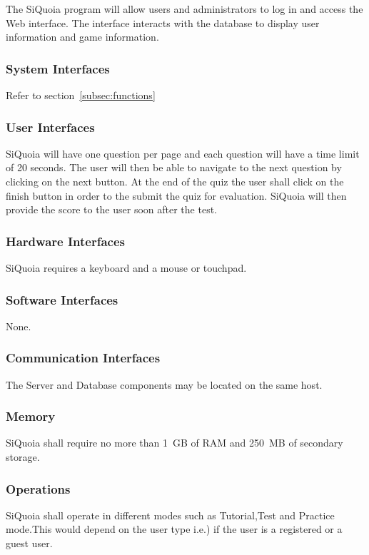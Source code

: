 \documentclass[12pt]{paper}
\begin{document}
The SiQuoia program will allow users and administrators to log in and
access the Web interface.  The interface interacts with the database
to display user information and game information.

\subsubsection{System Interfaces}
Refer to section~\ref{subsec:functions}

\subsubsection{User Interfaces}
SiQuoia will have one question per page and each question will have a
time limit of 20 seconds. The user will then be able to navigate to
the next question by clicking on the next button. At the end of the
quiz the user shall click on the finish button in order to the submit
the quiz for evaluation. SiQuoia will then provide the score to the
user soon after the test.

\subsubsection{Hardware Interfaces}
SiQuoia requires a keyboard and a mouse or touchpad.

\subsubsection{Software Interfaces}
None.

\subsubsection{Communication Interfaces}
The Server and Database components may be located on the same host.

\subsubsection{Memory}
SiQuoia shall require no more than 1~GB of RAM and 250~MB of secondary
storage.

\subsubsection{Operations}
SiQuoia shall operate in different modes such as Tutorial,Test and
Practice mode.This would depend on the user type i.e.) if the user is
a registered or a guest user.
\end{document}
